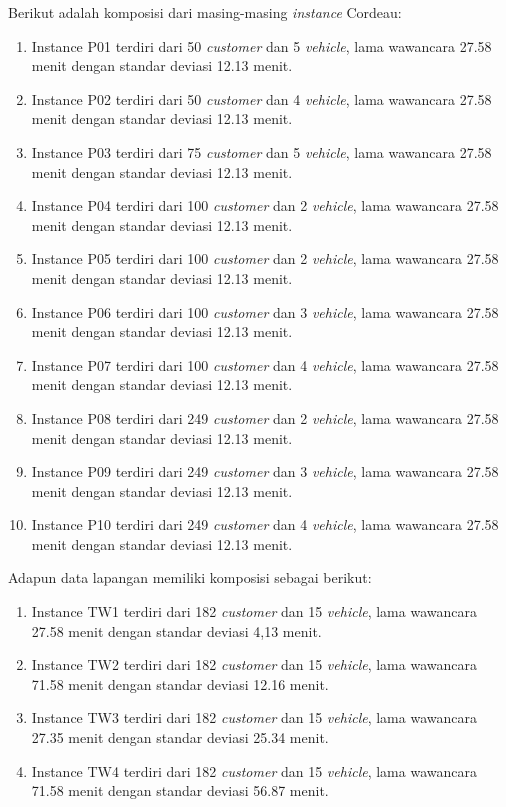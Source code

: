 Berikut adalah komposisi dari masing-masing \textit{instance} Cordeau:
\begin{enumerate}
	\item Instance P01 terdiri dari 50 \textit{customer} dan 5 \textit{vehicle}, lama wawancara 27.58 menit dengan standar deviasi 12.13 menit.
	\item Instance P02 terdiri dari 50 \textit{customer} dan 4 \textit{vehicle}, lama wawancara 27.58 menit dengan standar deviasi 12.13 menit.
	\item Instance P03 terdiri dari 75 \textit{customer} dan 5 \textit{vehicle}, lama wawancara 27.58 menit dengan standar deviasi 12.13 menit.
	\item Instance P04 terdiri dari 100 \textit{customer} dan 2 \textit{vehicle}, lama wawancara 27.58 menit dengan standar deviasi 12.13 menit.
	\item Instance P05 terdiri dari 100 \textit{customer} dan 2 \textit{vehicle}, lama wawancara 27.58 menit dengan standar deviasi 12.13 menit.
	\item Instance P06 terdiri dari 100 \textit{customer} dan 3 \textit{vehicle}, lama wawancara 27.58 menit dengan standar deviasi 12.13 menit.
	\item Instance P07 terdiri dari 100 \textit{customer} dan 4 \textit{vehicle}, lama wawancara 27.58 menit dengan standar deviasi 12.13 menit.
	\item Instance P08 terdiri dari 249 \textit{customer} dan 2 \textit{vehicle}, lama wawancara 27.58 menit dengan standar deviasi 12.13 menit.
	\item Instance P09 terdiri dari 249 \textit{customer} dan 3 \textit{vehicle}, lama wawancara 27.58 menit dengan standar deviasi 12.13 menit.
	\item Instance P10 terdiri dari 249 \textit{customer} dan 4 \textit{vehicle}, lama wawancara 27.58 menit dengan standar deviasi 12.13 menit.
\end{enumerate}
Adapun data lapangan memiliki komposisi sebagai berikut:
\begin{enumerate}
	\item Instance TW1 terdiri dari 182 \textit{customer} dan 15 \textit{vehicle}, lama wawancara 27.58 menit dengan standar deviasi 4,13 menit.
	\item Instance TW2 terdiri dari 182 \textit{customer} dan 15 \textit{vehicle}, lama wawancara 71.58 menit dengan standar deviasi 12.16 menit.
	\item Instance TW3 terdiri dari 182 \textit{customer} dan 15 \textit{vehicle}, lama wawancara 27.35 menit dengan standar deviasi 25.34 menit.
	\item Instance TW4 terdiri dari 182 \textit{customer} dan 15 \textit{vehicle}, lama wawancara 71.58 menit dengan standar deviasi 56.87 menit.
\end{enumerate}


